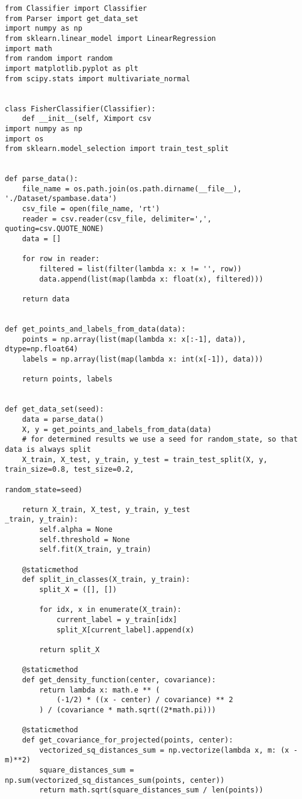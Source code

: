 \begin{lstlisting}[style=py]
from Classifier import Classifier
from Parser import get_data_set
import numpy as np
from sklearn.linear_model import LinearRegression
import math
from random import random
import matplotlib.pyplot as plt
from scipy.stats import multivariate_normal


class FisherClassifier(Classifier):
    def __init__(self, Ximport csv
import numpy as np
import os
from sklearn.model_selection import train_test_split


def parse_data():
    file_name = os.path.join(os.path.dirname(__file__), './Dataset/spambase.data')
    csv_file = open(file_name, 'rt')
    reader = csv.reader(csv_file, delimiter=',', quoting=csv.QUOTE_NONE)
    data = []

    for row in reader:
        filtered = list(filter(lambda x: x != '', row))
        data.append(list(map(lambda x: float(x), filtered)))

    return data


def get_points_and_labels_from_data(data):
    points = np.array(list(map(lambda x: x[:-1], data)), dtype=np.float64)
    labels = np.array(list(map(lambda x: int(x[-1]), data)))

    return points, labels


def get_data_set(seed):
    data = parse_data()
    X, y = get_points_and_labels_from_data(data)
    # for determined results we use a seed for random_state, so that data is always split
    X_train, X_test, y_train, y_test = train_test_split(X, y, train_size=0.8, test_size=0.2,
                                                        random_state=seed)

    return X_train, X_test, y_train, y_test
_train, y_train):
        self.alpha = None
        self.threshold = None
        self.fit(X_train, y_train)

    @staticmethod
    def split_in_classes(X_train, y_train):
        split_X = ([], [])

        for idx, x in enumerate(X_train):
            current_label = y_train[idx]
            split_X[current_label].append(x)

        return split_X

    @staticmethod
    def get_density_function(center, covariance):
        return lambda x: math.e ** (
            (-1/2) * ((x - center) / covariance) ** 2
        ) / (covariance * math.sqrt((2*math.pi)))

    @staticmethod
    def get_covariance_for_projected(points, center):
        vectorized_sq_distances_sum = np.vectorize(lambda x, m: (x - m)**2)
        square_distances_sum = np.sum(vectorized_sq_distances_sum(points, center))
        return math.sqrt(square_distances_sum / len(points))


\end{lstlisting}
